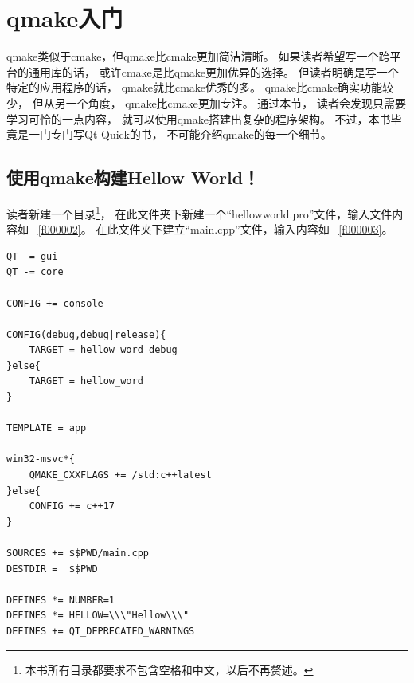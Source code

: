 ﻿




\FloatBarrier
\section{
qmake入门
}\label{s100310}


qmake类似于cmake，但qmake比cmake更加简洁清晰。
如果读者希望写一个跨平台的通用库的话，
或许cmake是比qmake更加优异的选择。
但读者明确是写一个特定的应用程序的话，
qmake就比cmake优秀的多。
qmake比cmake确实功能较少，
但从另一个角度，
qmake比cmake更加专注。
通过本节，
读者会发现只需要学习可怜的一点内容，
就可以使用qmake搭建出复杂的程序架构。
不过，本书毕竟是一门专门写Qt Quick的书，
不可能介绍qmake的每一个细节。

\FloatBarrier
\subsection{
使用qmake构建Hellow World！
}\label{ss000610}

读者新建一个目录\footnote{
本书所有目录都要求不包含空格和中文，以后不再赘述。
}，
在此文件夹下新建一个“hellow\underline{\hspace{0.5em}}world.pro”文件，输入文件内容如
\lstlistingname\ \ref{f000002}。
在此文件夹下建立“main.cpp”文件，输入内容如
\lstlistingname\ \ref{f000003}。

\FloatBarrier
\begin{lstlisting}[label=f000002,
caption=GoodLuck,
title=\lstlistingname\ \thelstlisting
]
QT -= gui
QT -= core

CONFIG += console

CONFIG(debug,debug|release){
    TARGET = hellow_word_debug
}else{
    TARGET = hellow_word
}

TEMPLATE = app

win32-msvc*{
    QMAKE_CXXFLAGS += /std:c++latest
}else{
    CONFIG += c++17
}

SOURCES += $$PWD/main.cpp
DESTDIR =  $$PWD

DEFINES *= NUMBER=1
DEFINES *= HELLOW=\\\"Hellow\\\"
DEFINES += QT_DEPRECATED_WARNINGS
\end{lstlisting}          %

